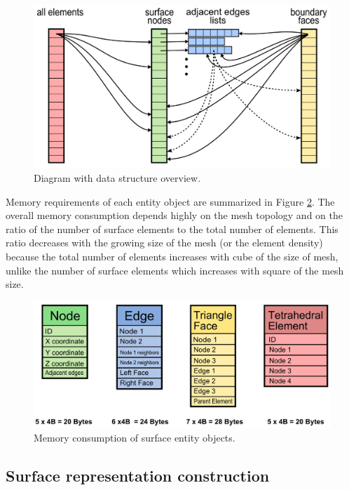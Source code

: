 \begin{figure}[H]
\centering
\includegraphics[width=\textwidth]{figures/appendix-mesh-visualization/figure4}
\decoRule
\caption[Data structure overview]{Diagram with data structure overview.}
\label{fig:data-structure-mesh}
\end{figure}

Memory requirements of each entity object are summarized in Figure \ref{fig:surface-rep-memory}. The overall memory consumption depends highly on the mesh topology and on the ratio of the number of surface elements to the total number of elements. This ratio decreases with the growing size of the mesh (or the element density) because the total number of elements increases with cube of the size of mesh, unlike the number of surface elements which increases with square of the mesh size.

\begin{figure}[H]
\centering
\includegraphics[width=\textwidth]{figures/appendix-mesh-visualization/figure5}
\decoRule
\caption[Memory consumption of surface representation]{Memory consumption of surface entity objects.}
\label{fig:surface-rep-memory}
\end{figure}


\subsection{Surface representation construction}